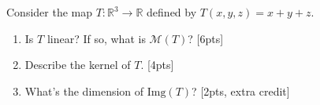 \documentclass{amsart}
\begin{document}
	
\vspace{2em}

Consider the map $T:\mathbb{R}^3\to\mathbb{R}$ defined by $T(x,y,z)=x+y+z$.

\begin{enumerate}
\item  Is $T$ linear? If so, what is $\mathcal{M}(T)$? [6pts]
\vspace{20em}
\item Describe the kernel of $T$. [4pts]
\vspace{20em}
\item What's the dimension of $\text{Img}(T)$? [2pts, extra credit]


\end{enumerate}


%
%
\end{document}
